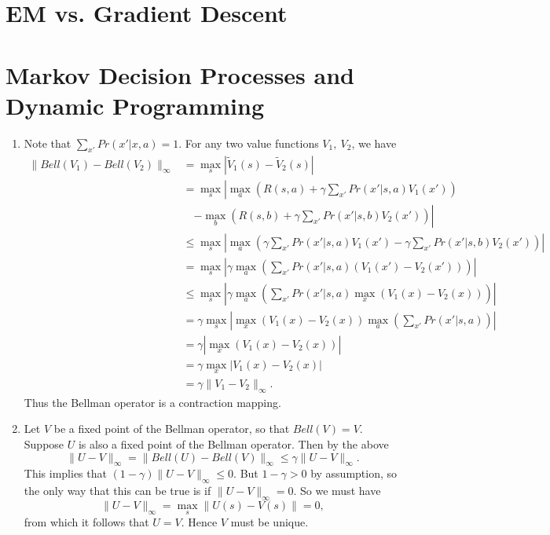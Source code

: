 \documentclass{article}
\begin{document}

\section{EM vs. Gradient Descent}


\section{Markov Decision Processes and Dynamic Programming}
\begin{enumerate}
    \item Note that $\sum_{x'}Pr(x'|x,a) = 1$.
    For any two value functions $V_1,~V_2$, we have
    \begin{align*}
        \|Bell(V_1)-Bell(V_2)\|_{\infty} &= \max_s\left|\tilde V_1(s)-\tilde V_2(s)\right|\\
        &= \max_s\left|\max_a\left(R(s,a) +\gamma\sum_{x'}Pr(x'|s,a)V_1(x')\right)\right.\\&\quad\left.-\max_b\left(R(s,b) +\gamma\sum_{x'}Pr(x'|s,b)V_2(x')\right) \right| \\
        &\leq \max_s\left| \max_a\left(\gamma\sum_{x'}Pr(x'|s,a)V_1(x')-\gamma\sum_{x'}Pr(x'|s,b)V_2(x')\right)\right|\\
        &= \max_s\left|\gamma\max_a\left(\sum_{x'}Pr(x'|s,a)\left(V_1(x')-V_2(x')\right)\right)\right|\\
        &\leq \max_s\left|\gamma\max_a\left( \sum_{x'}Pr(x'|s,a)\max_{x}(V_1(x)-V_2(x))\right) \right|\\
        &= \gamma \max_s\left|\max_x(V_1(x)-V_2(x)) \max_a\left(\sum_{x'}Pr(x'|s,a)\right) \right|\\
        &= \gamma \left|\max_x(V_1(x)-V_2(x)) \right| \\
        &=\gamma \max_x\left|V_1(x)-V_2(x)\right|\\
        &= \gamma \|V_1-V_2\|_{\infty}.
    \end{align*}
    Thus the Bellman operator is a contraction mapping.
    \item Let $V$ be a fixed point of the Bellman operator, so that $Bell(V)=V$. Suppose $U$ is also a fixed point of the Bellman operator. Then by the above
    \[
        \|U-V\|_{\infty} = \|Bell(U)-Bell(V)\|_{\infty}\leq \gamma \|U-V\|_{\infty}.
    \]
    This implies that $(1-\gamma)\|U-V\|_{\infty}\leq0$. But $1-\gamma>0$ by assumption, so the only way that this can be true is if $\|U-V\|_{\infty}=0$. So we must have
    \[
        \|U-V\|_{\infty}=\max_s\|U(s)-V(s)\|=0,
    \]
    from which it follows that $U=V$. Hence $V$ must be unique.
\end{enumerate}
\end{document}
